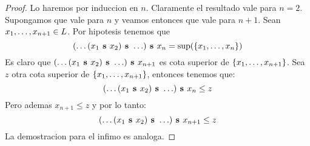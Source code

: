 \begin{proof}
  Lo haremos por induccion en $n$. Claramente el resultado vale para $n = 2$. Supongamos que vale para $n$
  y veamos entonces que vale para $n + 1$. Sean $x_{1}, \dots, x_{n+1} \in L$.
  Por hipotesis tenemos que 
  $$
  \supbin{(\dots\supbin{(\supbin{x_1}{x_2})}{\dots})}{x_n} = \sup({\{\succession{x}{1}{n}}\})
  $$
  Es claro que $\supbin{(\dots\supbin{(\supbin{x_1}{x_2})}{\dots})}{x_{n+1}}$ es cota superior de $\{x_{1}, \dots, x_{n+1}\}$. Sea $z$ otra cota superior de 
  $\{x_{1}, \dots, x_{n+1}\}$, entonces tenemos que:
  $$
  \supbin{(\dots\supbin{(\supbin{x_1}{x_2})}{\dots})}{x_n} \leq z
  $$
  Pero ademas $x_{n+1} \leq z$ y por lo tanto:
  $$
  \supbin{(\dots\supbin{(\supbin{x_1}{x_2})}{\dots})}{x_{n+1}} \leq z
  $$
  La demostracion para el infimo es analoga.

\end{proof}

